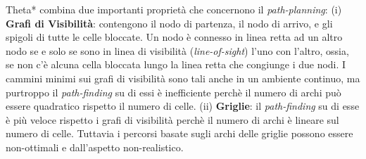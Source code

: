 \documentclass[12pt]{book}
\begin{document}
\par{Theta* combina due importanti propriet\`a che concernono il \emph{path-planning}: 
(i) \textbf{Grafi di Visibilit\`a}: contengono il nodo di partenza, il nodo di arrivo, e gli spigoli di tutte le celle bloccate. Un nodo \`e connesso in linea retta ad un altro nodo se e solo se sono in linea di visibilit\`a (\emph{line-of-sight}) l'uno con l'altro, ossia, se non c'\`e alcuna cella bloccata lungo la linea retta che congiunge i due nodi. I cammini minimi sui grafi di visibilit\`a sono tali anche in un ambiente continuo, ma purtroppo il \emph{path-finding} su di essi \`e inefficiente perch\`e il numero di archi pu\`o essere quadratico rispetto il numero di celle.
(ii) \textbf{Griglie}: il \emph{path-finding} su di esse \`e pi\`u veloce rispetto i grafi di visibilit\`a perch\`e il numero di archi \`e lineare sul numero di celle. Tuttavia i percorsi basate sugli archi delle griglie possono essere non-ottimali e dall'aspetto non-realistico.
}

\end{document}
